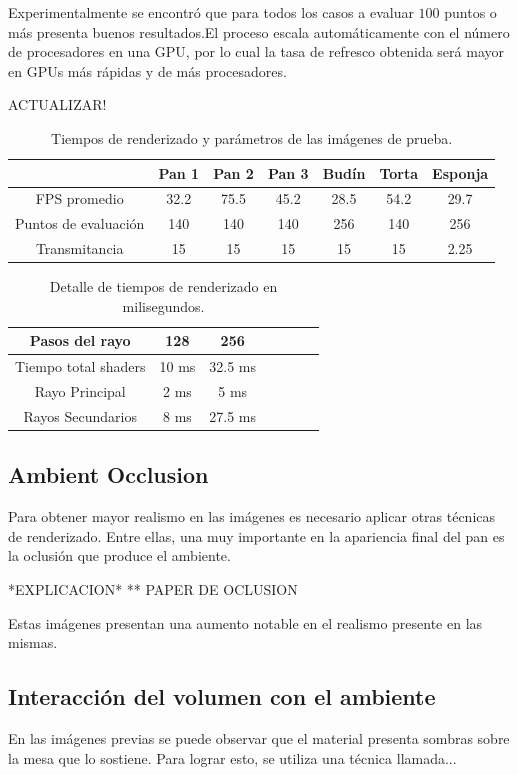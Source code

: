 \documentclass[spanish,a4paper,11pt,oneside,links]{report}
\begin{document}
Experimentalmente se encontró que para todos los casos a evaluar $100$ puntos o más presenta buenos resultados.El proceso escala automáticamente con el número de procesadores en una GPU, por lo cual la tasa de refresco obtenida será mayor en GPUs más rápidas y de más procesadores.


ACTUALIZAR!
\begin{table}[htb]
\centering
\begin{tabular}{|c|c|c|c|c|c|c|}
\hline &  Pan 1 & Pan 2 & Pan 3 & Budín & Torta & Esponja \\
\hline
\hline
 FPS promedio  & 32.2 &  75.5 &  45.2 & 28.5 &  54.2 & 29.7\\
\hline
 Puntos de evaluación &  140 &  140 &  140 & 256 &  140 & 256 \\
\hline
 Transmitancia &  15 &  15 &  15 & 15 &  15 & 2.25 \\
\hline
\end{tabular}
\caption{Tiempos de renderizado y parámetros de las imágenes de prueba.}
\label{tab:n1}
\end{table}

\begin{table}[htb]
\centering
\begin{tabular}{|c|c|c|c|c|c|c|}
\hline
 Pasos del rayo         & 128 &  256 \\
\hline
\hline
 Tiempo total shaders   & 10 ms &  32.5 ms \\
\hline
 Rayo Principal         & 2 ms  & 5 ms  \\
\hline
 Rayos Secundarios      &  8 ms & 27.5 ms  \\
\hline
\end{tabular}
\caption{Detalle de tiempos de renderizado en milisegundos.}
\label{tab:n2}
\end{table}


\subsection{Ambient Occlusion}
Para obtener mayor realismo en las imágenes es necesario aplicar otras técnicas de renderizado. Entre ellas, una muy importante en la apariencia final del pan es la oclusión que produce el ambiente.

*EXPLICACION* 
** PAPER DE OCLUSION

Estas imágenes presentan una aumento notable en el realismo presente en las mismas.

\subsection{Interacción del volumen con el ambiente}
En las imágenes previas se puede observar que el material presenta sombras sobre la mesa que lo sostiene. Para lograr esto, se utiliza una técnica llamada...
\end{document}
